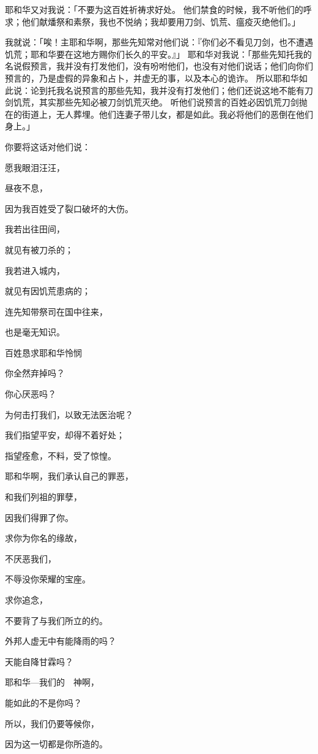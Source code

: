 {\par }{\PP {}耶和华又对我说：「不要为这百姓祈祷求好处。
他们禁食的时候，我不听他们的呼求；他们献燔祭和素祭，我也不悦纳；我却要用刀剑、饥荒、瘟疫灭绝他们。」
\par }{\PP {}我就说：「唉！主耶和华啊，那些先知常对他们说：『你们必不看见刀剑，也不遭遇饥荒；耶和华要在这地方赐你们长久的平安。』」
耶和华对我说：「那些先知托我的名说假预言，我并没有打发他们，没有吩咐他们，也没有对他们说话；他们向你们预言的，乃是虚假的异象和占卜，并虚无的事，以及本心的诡诈。
所以耶和华如此说：论到托我名说预言的那些先知，我并没有打发他们；他们还说这地不能有刀剑饥荒，其实那些先知必被刀剑饥荒灭绝。
听他们说预言的百姓必因饥荒刀剑抛在{}的街道上，无人葬埋。他们连妻子带儿女，都是如此。我必将他们的恶倒在他们身上。」
\par }{\Q {}你要将这话对他们说：
\par }{\Q 愿我眼泪汪汪，
\par }{\Q 昼夜不息，
\par }{\Q 因为我百姓受了裂口破坏的大伤。
\par }{\Q {}我若出往田间，
\par }{\Q 就见有被刀杀的；
\par }{\Q 我若进入城内，
\par }{\Q 就见有因饥荒患病的；
\par }{\Q 连先知带祭司在国中往来，
\par }{\Q 也是毫无知识。
\par }{\SH 百姓恳求耶和华怜悯
\par }{\Q {}你全然弃掉{}吗？
\par }{\Q 你心厌恶{}吗？
\par }{\Q 为何击打我们，以致无法医治呢？
\par }{\Q 我们指望平安，却得不着好处；
\par }{\Q 指望痊愈，不料，受了惊惶。
\par }{\Q {}耶和华啊，我们承认自己的罪恶，
\par }{\Q 和我们列祖的罪孽，
\par }{\Q 因我们得罪了你。
\par }{\Q {}求你为你名的缘故，
\par }{\Q 不厌恶我们，
\par }{\Q 不辱没你荣耀的宝座。
\par }{\Q 求你追念，
\par }{\Q 不要背了与我们所立的约。
\par }{\Q {}外邦人虚无{}中有能降雨的吗？
\par }{\Q 天能自降甘霖吗？
\par }{\Q 耶和华—我们的　神啊，
\par }{\Q 能如此的不是你吗？
\par }{\Q 所以，我们仍要等候你，
\par }{\Q 因为这一切都是你所造的。

}
